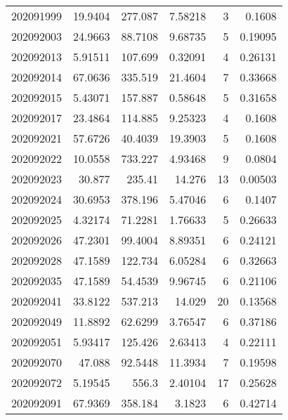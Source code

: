\begin{tabular}{rrrrrr}
 202091999 &         19.9404  &      277.087  &            7.58218 &           3 & 0.1608  \\
 202092003 &         24.9663  &       88.7108 &            9.68735 &           5 & 0.19095 \\
 202092013 &          5.91511 &      107.699  &            0.32091 &           4 & 0.26131 \\
 202092014 &         67.0636  &      335.519  &           21.4604  &           7 & 0.33668 \\
 202092015 &          5.43071 &      157.887  &            0.58648 &           5 & 0.31658 \\
 202092017 &         23.4864  &      114.885  &            9.25323 &           4 & 0.1608  \\
 202092021 &         57.6726  &       40.4039 &           19.3903  &           5 & 0.1608  \\
 202092022 &         10.0558  &      733.227  &            4.93468 &           9 & 0.0804  \\
 202092023 &         30.877   &      235.41   &           14.276   &          13 & 0.00503 \\
 202092024 &         30.6953  &      378.196  &            5.47046 &           6 & 0.1407  \\
 202092025 &          4.32174 &       71.2281 &            1.76633 &           5 & 0.26633 \\
 202092026 &         47.2301  &       99.4004 &            8.89351 &           6 & 0.24121 \\
 202092028 &         47.1589  &      122.734  &            6.05284 &           6 & 0.32663 \\
 202092035 &         47.1589  &       54.4539 &            9.96745 &           6 & 0.21106 \\
 202092041 &         33.8122  &      537.213  &           14.029   &          20 & 0.13568 \\
 202092049 &         11.8892  &       62.6299 &            3.76547 &           6 & 0.37186 \\
 202092051 &          5.93417 &      125.426  &            2.63413 &           4 & 0.22111 \\
 202092070 &         47.088   &       92.5448 &           11.3934  &           7 & 0.19598 \\
 202092072 &          5.19545 &      556.3    &            2.40104 &          17 & 0.25628 \\
 202092091 &         67.9369  &      358.184  &            3.1823  &           6 & 0.42714 \\

\end{tabular}
